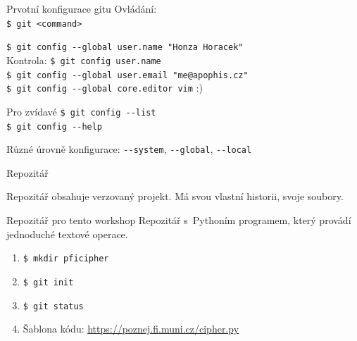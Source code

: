 \documentclass[
]{beamer}
\begin{document}
\begin{frame}{Prvotní konfigurace gitu}
Ovládání: \\
\texttt{\$ git <command>} \\
\vspace{1em}

\texttt{\$ git config -{}-global user.name "Honza Horacek"} \\
\pause
Kontrola: \texttt{\$ git config user.name} \\
\pause
\texttt{\$ git config -{}-global user.email "me@apophis.cz"} \\
\texttt{\$ git config -{}-global core.editor vim} :)
\pause

\begin{block}{Pro zvídavé}
\texttt{\$ git config -{}-list} \\
\texttt{\$ git config -{}-help}

Různé úrovně konfigurace: \texttt{-{}-system}, \texttt{-{}-global}, \texttt{-{}-local}
\end{block}
\end{frame}


\begin{frame}{Repozitář}

Repozitář obsahuje verzovaný projekt. Má svou vlastní historii, svoje soubory.

\begin{block}{Repozitář pro tento workshop}
Repozitář s Pythoním programem, který provádí jednoduché textové  operace.
\end{block}

\begin{enumerate}
	\item \texttt{\$ mkdir pficipher}
	\item \texttt{\$ git init}
	\item \texttt{\$ git status}
	\item Šablona kódu: \url{https://poznej.fi.muni.cz/cipher.py}
\end{enumerate}
\end{frame}
\end{document}
